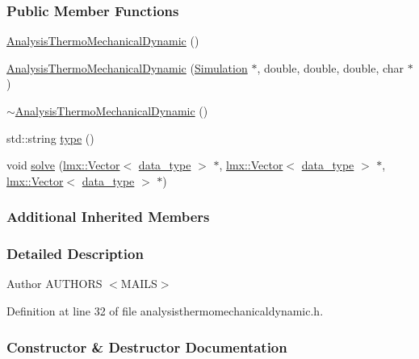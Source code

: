 \subsubsection*{Public Member Functions}
\begin{DoxyCompactItemize}
\item 
\hyperlink{classmknix_1_1_analysis_thermo_mechanical_dynamic_a17e59510fa5636e15a7b03feb0604b4d}{Analysis\+Thermo\+Mechanical\+Dynamic} ()
\item 
\hyperlink{classmknix_1_1_analysis_thermo_mechanical_dynamic_a78aea19c65b7788233352a32c984a353}{Analysis\+Thermo\+Mechanical\+Dynamic} (\hyperlink{classmknix_1_1_simulation}{Simulation} $\ast$, double, double, double, char $\ast$)
\item 
\hyperlink{classmknix_1_1_analysis_thermo_mechanical_dynamic_abb98d93d51b0d88883d0408965f979bd}{$\sim$\+Analysis\+Thermo\+Mechanical\+Dynamic} ()
\item 
std\+::string \hyperlink{classmknix_1_1_analysis_thermo_mechanical_dynamic_ad6a3d20e5522565eaa53854f1f65e808}{type} ()
\item 
void \hyperlink{classmknix_1_1_analysis_thermo_mechanical_dynamic_a804b252666b03bf530f04fe261f5e402}{solve} (\hyperlink{classlmx_1_1_vector}{lmx\+::\+Vector}$<$ \hyperlink{namespacemknix_a16be4b246fbf2cceb141e3a179111020}{data\+\_\+type} $>$ $\ast$, \hyperlink{classlmx_1_1_vector}{lmx\+::\+Vector}$<$ \hyperlink{namespacemknix_a16be4b246fbf2cceb141e3a179111020}{data\+\_\+type} $>$ $\ast$, \hyperlink{classlmx_1_1_vector}{lmx\+::\+Vector}$<$ \hyperlink{namespacemknix_a16be4b246fbf2cceb141e3a179111020}{data\+\_\+type} $>$ $\ast$)
\end{DoxyCompactItemize}
\subsubsection*{Additional Inherited Members}


\subsubsection{Detailed Description}
\begin{DoxyAuthor}{Author}
A\+U\+T\+H\+O\+R\+S $<$\+M\+A\+I\+L\+S$>$ 
\end{DoxyAuthor}


Definition at line 32 of file analysisthermomechanicaldynamic.\+h.



\subsubsection{Constructor \& Destructor Documentation}
\hypertarget{classmknix_1_1_analysis_thermo_mechanical_dynamic_a17e59510fa5636e15a7b03feb0604b4d}{}
